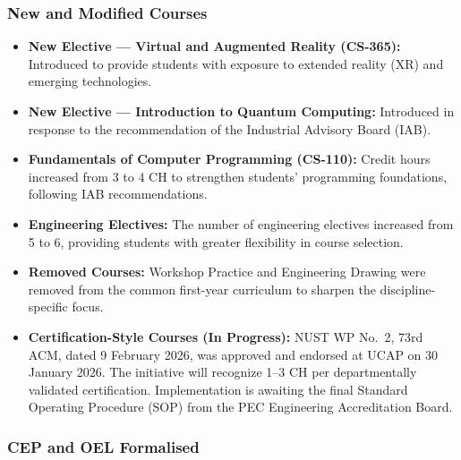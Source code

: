 \subsubsection{New and Modified Courses}
\label{subsubsec:new-modified-courses}

\begin{itemize}[noitemsep, topsep=0pt]

    \item \textbf{New Elective --- Virtual and Augmented Reality (CS-365):}
    Introduced to provide students with exposure to extended reality (XR)
    and emerging technologies.

    \item \textbf{New Elective --- Introduction to Quantum Computing:}
    Introduced in response to the recommendation of the Industrial
    Advisory Board (IAB).

    \item \textbf{Fundamentals of Computer Programming (CS-110):}
    Credit hours increased from 3 to 4 CH to strengthen students'
    programming foundations, following IAB recommendations.

    \item \textbf{Engineering Electives:}
    The number of engineering electives increased from 5 to 6,
    providing students with greater flexibility in course selection.

    \item \textbf{Removed Courses:}
    Workshop Practice and Engineering Drawing were removed from the
    common first-year curriculum to sharpen the discipline-specific
    focus.

    \item \textbf{Certification-Style Courses (In Progress):}
    NUST WP No.~2, 73rd ACM, dated 9 February 2026, was approved
    and endorsed at UCAP on 30 January 2026. The initiative will
    recognize 1--3 CH per departmentally validated certification.
    Implementation is awaiting the final Standard Operating
    Procedure (SOP) from the PEC Engineering Accreditation Board.

\end{itemize}


\subsubsection{CEP and OEL Formalised}
\label{subsubsec:cep-oel}


